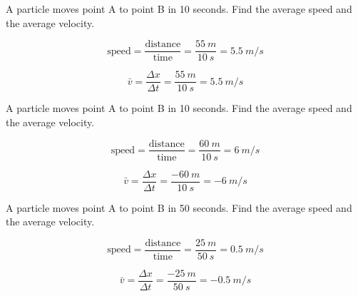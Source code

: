 \documentclass[]{exam}
\begin{document}
\begin{questions}
\question 
A particle moves point A to point B in 10 seconds. Find the average speed and the average velocity.


\begin{solution}
\begin{equation*}
    \text{speed} = \frac{\text{distance}}{\text{time}} = \frac{\SI{55}{m}}{\SI{10}{s}} = \boxed{\SI{5.5}{m/s}}
\end{equation*}

\begin{equation*}
    \bar{v} = \frac{\Delta x}{\Delta t} = \frac{\SI{55}{m}}{\SI{10}{s}} = \boxed{\SI{5.5}{m/s}}
\end{equation*}
\end{solution}

\question 
A particle moves point A to point B in 10 seconds. Find the average speed and the average velocity.


\begin{solution}
\begin{equation*}
    \text{speed} = \frac{\text{distance}}{\text{time}} = \frac{\SI{60}{m}}{\SI{10}{s}} = \boxed{\SI{6}{m/s}}
\end{equation*}

\begin{equation*}
    \bar{v} = \frac{\Delta x}{\Delta t} = \frac{\SI{-60}{m}}{\SI{10}{s}} = \boxed{\SI{-6}{m/s}}
\end{equation*}
\end{solution}

\question 
A particle moves point A to point B in 50 seconds. Find the average speed and the average velocity.


\begin{solution}
\begin{equation*}
    \text{speed} = \frac{\text{distance}}{\text{time}} = \frac{\SI{25}{m}}{\SI{50}{s}} = \boxed{\SI{0.5}{m/s}}
\end{equation*}

\begin{equation*}
    \bar{v} = \frac{\Delta x}{\Delta t} = \frac{\SI{-25}{m}}{\SI{50}{s}} = \boxed{\SI{-0.5}{m/s}}
\end{equation*}
\end{solution}


\end{questions}
\end{document}
